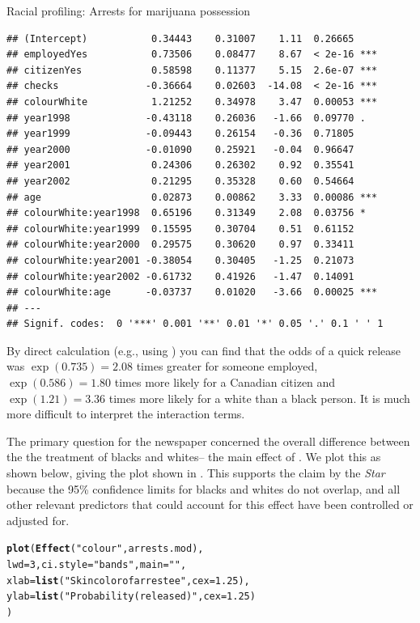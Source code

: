 \documentclass[11pt]{book}\usepackage[]{graphicx}\usepackage[]{color}
\makeatletter
\newcommand{\hlnum}[1]{\textcolor[rgb]{0.686,0.059,0.569}{#1}}%
\newcommand{\hlstr}[1]{\textcolor[rgb]{0.192,0.494,0.8}{#1}}%
\newcommand{\hlstd}[1]{\textcolor[rgb]{0.345,0.345,0.345}{#1}}%
\newcommand{\hlkwc}[1]{\textcolor[rgb]{0.333,0.667,0.333}{#1}}%
\newcommand{\hlkwd}[1]{\textcolor[rgb]{0.737,0.353,0.396}{\textbf{#1}}}%
\newenvironment{kframe}{%
 \def\at@end@of@kframe{}%
 \ifinner\ifhmode%
  \def\at@end@of@kframe{\end{minipage}}%
  \begin{minipage}{\columnwidth}%
 \fi\fi%
 \def\FrameCommand##1{\hskip\@totalleftmargin \hskip-\fboxsep
 \colorbox{shadecolor}{##1}\hskip-\fboxsep
     \hskip-\linewidth \hskip-\@totalleftmargin \hskip\columnwidth}%
 \MakeFramed {\advance\hsize-\width
   \@totalleftmargin\z@ \linewidth\hsize
   \@setminipage}}%
 {\par\unskip\endMakeFramed%
 \at@end@of@kframe}
\newenvironment{knitrout}{}{} %
\renewenvironment{knitrout}{\small\renewcommand{\baselinestretch}{.85}}{} %
\makeatother
\begin{document}
\begin{Example}[arrests]{Racial profiling: Arrests for marijuana possession}
\begin{knitrout}
\begin{kframe}
\begin{verbatim}
## (Intercept)           0.34443    0.31007    1.11  0.26665    
## employedYes           0.73506    0.08477    8.67  < 2e-16 ***
## citizenYes            0.58598    0.11377    5.15  2.6e-07 ***
## checks               -0.36664    0.02603  -14.08  < 2e-16 ***
## colourWhite           1.21252    0.34978    3.47  0.00053 ***
## year1998             -0.43118    0.26036   -1.66  0.09770 .  
## year1999             -0.09443    0.26154   -0.36  0.71805    
## year2000             -0.01090    0.25921   -0.04  0.96647    
## year2001              0.24306    0.26302    0.92  0.35541    
## year2002              0.21295    0.35328    0.60  0.54664    
## age                   0.02873    0.00862    3.33  0.00086 ***
## colourWhite:year1998  0.65196    0.31349    2.08  0.03756 *  
## colourWhite:year1999  0.15595    0.30704    0.51  0.61152    
## colourWhite:year2000  0.29575    0.30620    0.97  0.33411    
## colourWhite:year2001 -0.38054    0.30405   -1.25  0.21073    
## colourWhite:year2002 -0.61732    0.41926   -1.47  0.14091    
## colourWhite:age      -0.03737    0.01020   -3.66  0.00025 ***
## ---
## Signif. codes:  0 '***' 0.001 '**' 0.01 '*' 0.05 '.' 0.1 ' ' 1
\end{verbatim}
\end{kframe}
\end{knitrout}
By direct calculation (e.g., using ) you can find that
the odds of a quick release was $\exp({0.735})= 2.08$ times greater for someone employed,
$\exp({0.586})= 1.80$ times more likely for a Canadian citizen and 
$\exp({1.21})= 3.36$ times more likely for a white than a black person.
It is much more difficult to interpret the interaction terms.

The primary question for the newspaper concerned the overall difference between the 
the treatment of blacks and whites-- the main effect of .
We plot this as shown below, giving the plot shown in .
This supports the claim by the \emph{Star} because the 95\% confidence limits for
blacks and whites do not overlap, and all other relevant predictors that could
account for this effect have been controlled or adjusted for.

\begin{knitrout}
\color{fgcolor}\begin{kframe}
\begin{alltt}
\hlkwd{plot}\hlstd{(}\hlkwd{Effect}\hlstd{(}\hlstr{"colour"}\hlstd{, arrests.mod),}
     \hlkwc{lwd}\hlstd{=}\hlnum{3}\hlstd{,} \hlkwc{ci.style}\hlstd{=}\hlstr{"bands"}\hlstd{,} \hlkwc{main}\hlstd{=}\hlstr{""}\hlstd{,}
     \hlkwc{xlab} \hlstd{=} \hlkwd{list}\hlstd{(}\hlstr{"Skin color of arrestee"}\hlstd{,} \hlkwc{cex}\hlstd{=}\hlnum{1.25}\hlstd{),}
     \hlkwc{ylab} \hlstd{=} \hlkwd{list}\hlstd{(}\hlstr{"Probability(released)"}\hlstd{,} \hlkwc{cex}\hlstd{=}\hlnum{1.25}\hlstd{)}
  \hlstd{)}
\end{alltt}
\end{kframe}\begin{figure}[!htbp]



\end{figure}
\end{knitrout}
\end{Example}
\end{document}

